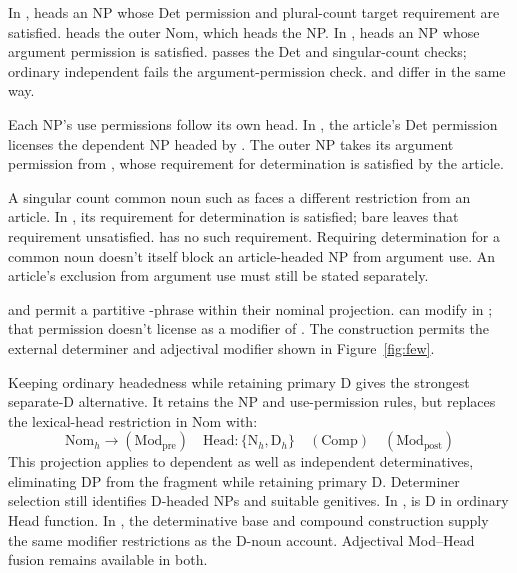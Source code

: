 \documentclass[12pt]{article}
\begin{document}
In ,  heads an NP whose Det permission and plural-count target requirement are satisfied.  heads the outer Nom, which heads the NP. In ,  heads an NP whose argument permission is satisfied.  passes the Det and singular-count checks; ordinary independent  fails the argument-permission check.  and  differ in the same way.

Each NP's use permissions follow its own head. In , the article's Det permission licenses the dependent NP headed by . The outer NP takes its argument permission from , whose requirement for determination is satisfied by the article.

A singular count common noun such as  faces a different restriction from an article. In , its requirement for determination is satisfied; bare  leaves that requirement unsatisfied.  has no such requirement. Requiring determination for a common noun doesn't itself block an article-headed NP from argument use. An article's exclusion from argument use must still be stated separately.

 and  permit a partitive -phrase within their nominal projection.  can modify  in ; that permission doesn't license  as a modifier of . The construction  permits the external determiner and adjectival modifier shown in Figure~\ref{fig:few}.

Keeping ordinary headedness while retaining primary D gives the strongest separate-D alternative. It retains the NP and use-permission rules, but replaces the lexical-head restriction in Nom with:
\[
\mathrm{Nom}_{h}\to(\mathrm{Mod}_{\mathrm{pre}})\quad\mathrm{Head}:\{\mathrm{N}_{h},\mathrm{D}_{h}\}\quad(\mathrm{Comp})\quad(\mathrm{Mod}_{\mathrm{post}})
\]
This projection applies to dependent as well as independent determinatives, eliminating DP from the fragment while retaining primary D. Determiner selection still identifies D-headed NPs and suitable genitives. In ,  is D in ordinary Head function. In , the determinative base and compound construction supply the same modifier restrictions as the D-noun account. Adjectival Mod--Head fusion remains available in both.
\end{document}
